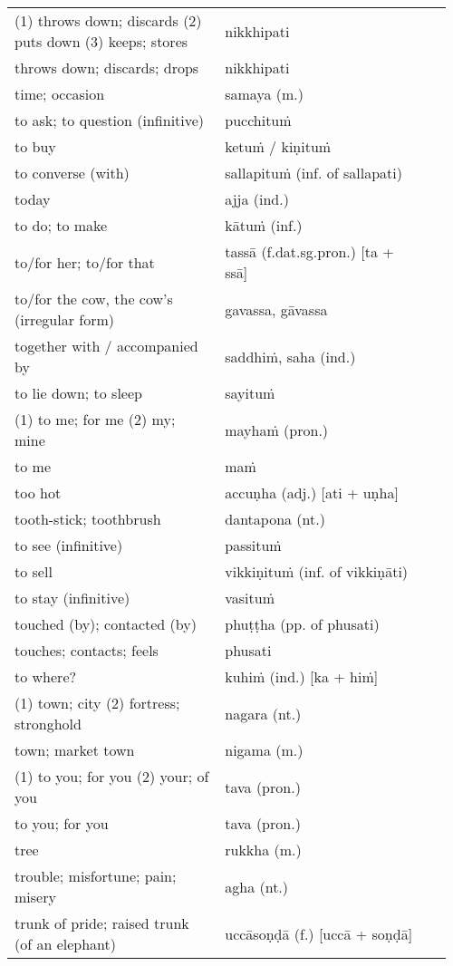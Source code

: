 \documentclass[a5paper]{memoir}
\begin{document}
\begin{longtable}{L{0.48\linewidth} L{0.48\linewidth} H}
(1) throws down; discards (2) puts down (3) keeps; stores & nikkhipati & \\[0pt]
throws down; discards; drops & nikkhipati & \\[0pt]
time; occasion & samaya (m.) & \\[0pt]
to ask; to question (infinitive) & pucchituṁ & \\[0pt]
to buy & ketuṁ / kiṇituṁ & \\[0pt]
to converse (with) & sallapituṁ (inf. of sallapati) & \\[0pt]
today & ajja (ind.) & \\[0pt]
to do; to make & kātuṁ (inf.) & \\[0pt]
to/for her; to/for that & tassā (f.dat.sg.pron.) [ta + ssā] & \\[0pt]
to/for the cow, the cow's (irregular form) & gavassa, gāvassa & \\[0pt]
together with / accompanied by & saddhiṁ, saha (ind.) & \\[0pt]
to lie down; to sleep & sayituṁ & \\[0pt]
(1) to me; for me (2) my; mine & mayhaṁ (pron.) & \\[0pt]
to me & maṁ & \\[0pt]
too hot & accuṇha (adj.) [ati + uṇha] & \\[0pt]
tooth-stick; toothbrush & dantapona (nt.) & \\[0pt]
to see (infinitive) & passituṁ & \\[0pt]
to sell & vikkiṇituṁ (inf. of vikkiṇāti) & \\[0pt]
to stay (infinitive) & vasituṁ & \\[0pt]
touched (by); contacted (by) & phuṭṭha (pp. of phusati) & \\[0pt]
touches; contacts; feels & phusati & \\[0pt]
to where? & kuhiṁ (ind.) [ka + hiṁ] & \\[0pt]
(1) town; city (2) fortress; stronghold & nagara (nt.) & \\[0pt]
town; market town & nigama (m.) & \\[0pt]
(1) to you; for you (2) your; of you & tava (pron.) & \\[0pt]
to you; for you & tava (pron.) & \\[0pt]
tree & rukkha (m.) & \\[0pt]
trouble; misfortune; pain; misery & agha (nt.) & \\[0pt]
trunk of pride; raised trunk (of an elephant) & uccāsoṇḍā (f.) [uccā + soṇḍā] & \\[0pt]

\end{longtable}
\end{document}
